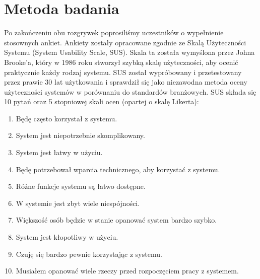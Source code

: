 \section{Metoda badania}
Po zakończeniu obu rozgrywek poprosiliśmy uczestników o wypełnienie stosownych ankiet.
Ankiety zostały opracowane zgodnie ze Skalą Użyteczności Systemu (System Usability Scale, SUS).
Skala ta została wymyślona przez Johna Brooke'a, który w 1986 roku stworzył szybką skalę użyteczności, aby
ocenić praktycznie każdy rodzaj systemu. \newline
SUS został wypróbowany i przetestowany przez prawie 30 lat użytkowania i sprawdził się jako
niezawodna metoda oceny użyteczności systemów w porównaniu do standardów branżowych. \newline
SUS składa się 10 pytań oraz 5 stopniowej skali ocen (opartej o skalę Likerta):
\begin{enumerate}
	\item Będę często korzystał z systemu.
	\item System jest niepotrzebnie skomplikowany.
	\item System jest łatwy w użyciu.
	\item Będę potrzebował wparcia technicznego, aby korzystać z systemu.
	\item Różne funkcje systemu są łatwo dostępne.
	\item W systemie jest zbyt wiele niespójności.
	\item Większość osób będzie w stanie opanować system bardzo szybko.
	\item System jest kłopotliwy w użyciu.
	\item Czuję się bardzo pewnie korzystając z systemu.
	\item Musiałem opanować wiele rzeczy przed rozpoczęciem pracy z systemem.
\end{enumerate}

